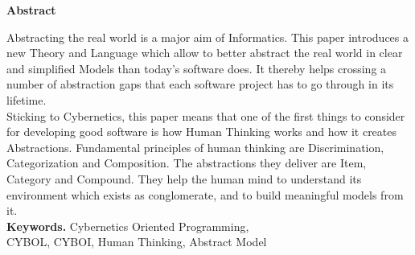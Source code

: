 %
%
%
%
%
%
%

\begin{center}
    \textbf{\large{Abstract}}
\end{center}
Abstracting the real world is a major aim of Informatics. This paper introduces
a new Theory and Language which allow to better abstract the real world in clear
and simplified Models than today's software does. It thereby helps crossing a
number of abstraction gaps that each software project has to go through in its
lifetime.\\
Sticking to Cybernetics, this paper means that one of the first things to
consider for developing good software is how Human Thinking works and how it
creates Abstractions. Fundamental principles of human thinking are Discrimination,
Categorization and Composition. The abstractions they deliver are Item, Category
and Compound. They help the human mind to understand its environment which exists
as conglomerate, and to build meaningful models from it.\\

\textbf{Keywords.} Cybernetics Oriented Programming,\\
CYBOL, CYBOI, Human Thinking, Abstract Model
